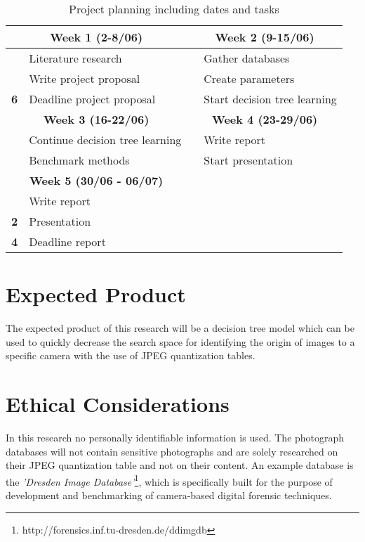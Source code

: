 \documentclass[a4paper,8pt]{article}
\begin{document}
\begin{table}[H]
\small
\caption{Project planning including dates and tasks}
\label{table:planning}
\begin{tabular}{|l l|l l|}

\hline
\multicolumn{2}{|c|}{\textbf{Week 1 (2-8/06)}} & \multicolumn{2}{|c|}{\textbf{Week 2 (9-15/06)}}\\
\hline
& Literature research & & Gather databases \\
& Write project proposal & & Create parameters  \\

\textbf{6} & Deadline project proposal & & Start decision tree learning \\ 
\hline
\multicolumn{2}{|c|}{\textbf{Week 3 (16-22/06)}} & \multicolumn{2}{|c|}{\textbf{Week 4 (23-29/06)}}\\
\hline
& Continue decision tree learning & & Write report\\
& Benchmark methods & & Start presentation\\
\hline
\multicolumn{2}{|c|}{\textbf{Week 5 (30/06 - 06/07)}} & & \\
\hline
& Write report &  \multicolumn{2}{|c|}{~} \\
\textbf{2} & Presentation &   \multicolumn{2}{|c|}{~}\\
\textbf{4} & Deadline report &  \multicolumn{2}{|c|}{~} \\
\hline

\hline
\end{tabular}
\end{table}

\section*{Expected Product}
The expected product of this research will be a decision tree model which can be used to quickly decrease the search space for identifying the origin of images to a specific camera with the use of JPEG quantization tables.

\section*{Ethical Considerations}
In this research no personally identifiable information is used. The photograph databases will not contain sensitive photographs and  are solely researched on their JPEG quantization table and not on their content. An example database is the \textit{'Dresden Image Database'}\footnote{http://forensics.inf.tu-dresden.de/ddimgdb}, which is specifically built for the purpose of development and benchmarking of camera-based digital forensic techniques.

\pagebreak

{}

\end{document}
